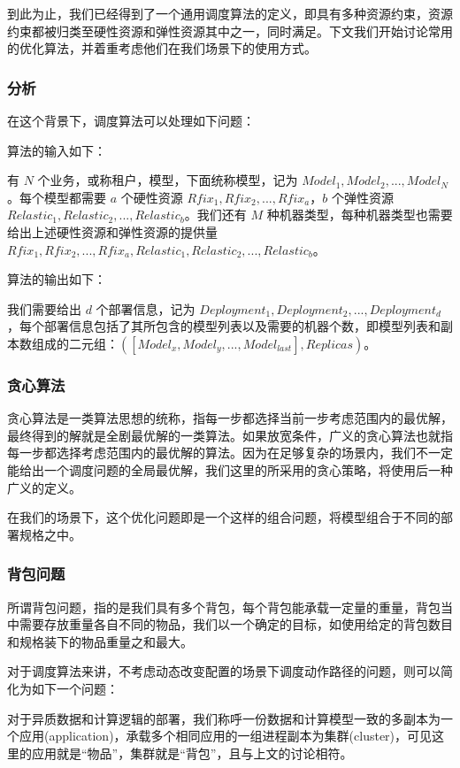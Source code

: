 到此为止，我们已经得到了一个通用调度算法的定义，即具有多种资源约束，资源约束都被归类至硬性资源和弹性资源其中之一，同时满足。下文我们开始讨论常用的优化算法，并着重考虑他们在我们场景下的使用方式。

\subsubsection{分析}

在这个背景下，调度算法可以处理如下问题：

算法的输入如下：

有 $N$ 个业务，或称租户，模型，下面统称模型，记为 $Model_1,Model_2,...,Model_N$。每个模型都需要 $a$ 个硬性资源 $Rfix_1,Rfix_2,...,Rfix_a$，$b$ 个弹性资源 $Relastic_1,Relastic_2,...,Relastic_b$。我们还有 $M$ 种机器类型，每种机器类型也需要给出上述硬性资源和弹性资源的提供量 $Rfix_1,Rfix_2,...,Rfix_a,Relastic_1,Relastic_2,...,Relastic_b$。

算法的输出如下：

我们需要给出 $d$ 个部署信息，记为 $Deployment_1,Deployment_2,...,Deployment_d$，每个部署信息包括了其所包含的模型列表以及需要的机器个数，即模型列表和副本数组成的二元组：$([Model_x,Model_y,...,Model_{last}],Replicas)$。

\subsubsection{贪心算法}

贪心算法是一类算法思想的统称，指每一步都选择当前一步考虑范围内的最优解，最终得到的解就是全剧最优解的一类算法。如果放宽条件，广义的贪心算法也就指每一步都选择考虑范围内的最优解的算法。因为在足够复杂的场景内，我们不一定能给出一个调度问题的全局最优解，我们这里的所采用的贪心策略，将使用后一种广义的定义。

在我们的场景下，这个优化问题即是一个这样的组合问题，将模型组合于不同的部署规格之中。

\subsubsection{背包问题}

所谓背包问题，指的是我们具有多个背包，每个背包能承载一定量的重量，背包当中需要存放重量各自不同的物品，我们以一个确定的目标，如使用给定的背包数目和规格装下的物品重量之和最大。

对于调度算法来讲，不考虑动态改变配置的场景下调度动作路径的问题，则可以简化为如下一个问题：

对于异质数据和计算逻辑的部署，我们称呼一份数据和计算模型一致的多副本为一个应用(application)，承载多个相同应用的一组进程副本为集群(cluster)，可见这里的应用就是“物品”，集群就是“背包”，且与上文的讨论相符。

